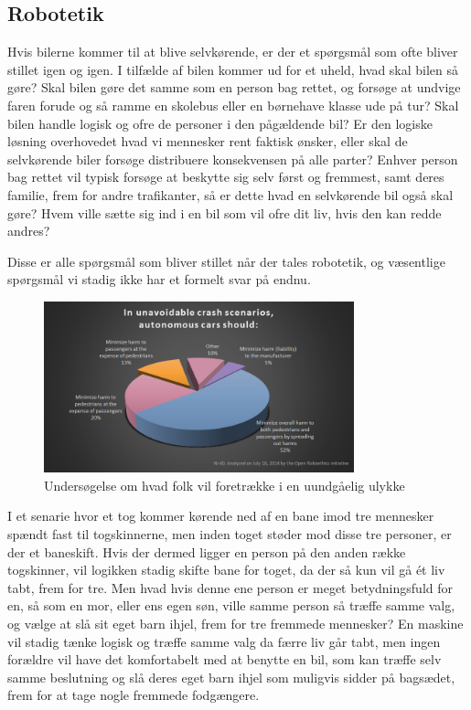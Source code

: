 \subsection{Robotetik}
	Hvis bilerne kommer til at blive selvkørende, er der et spørgsmål som ofte bliver stillet igen og igen. I tilfælde af bilen kommer ud for et uheld, hvad skal bilen så gøre? Skal bilen gøre det samme som en person bag rettet, og forsøge at undvige faren forude og så ramme en skolebus eller en børnehave klasse ude på tur? Skal bilen handle logisk og ofre de personer i den pågældende bil? Er den logiske løsning overhovedet hvad vi mennesker rent faktisk ønsker, eller skal de selvkørende biler forsøge distribuere konsekvensen på alle parter? Enhver person bag rettet vil typisk forsøge at beskytte sig selv først og fremmest, samt deres familie, frem for andre trafikanter, så er dette hvad en selvkørende bil også skal gøre? Hvem ville sætte sig ind i en bil som vil ofre dit liv, hvis den kan redde andres?
	
	Disse er alle spørgsmål som bliver stillet når der tales robotetik, og væsentlige spørgsmål vi stadig ikke har et formelt svar på endnu.
	\begin{figure}[h!]
		\centering
		\includegraphics[width=0.8\textwidth]{images/roboethics-2.jpg}
		\caption{Undersøgelse om hvad folk vil foretrække i en uundgåelig ulykke}
		\label{fig:etik_accident}
	\end{figure}
	\cite{rob_etik}
	 I et senarie hvor et tog kommer kørende ned af en bane imod tre mennesker spændt fast til togskinnerne, men inden toget støder mod disse tre personer, er der et baneskift. Hvis der dermed ligger en person på den anden række togskinner, vil logikken stadig skifte bane for toget, da der så kun vil gå ét liv tabt, frem for tre. Men hvad hvis denne ene person er meget betydningsfuld for en, så som en mor, eller ens egen søn, ville samme person så træffe samme valg, og vælge at slå sit eget barn ihjel, frem for tre fremmede mennesker? En maskine vil stadig tænke logisk og træffe samme valg da færre liv går tabt, men ingen forældre vil have det komfortabelt med at benytte en bil, som kan træffe selv samme beslutning og slå deres eget barn ihjel som muligvis sidder på bagsædet, frem for at tage nogle fremmede fodgængere.
	
